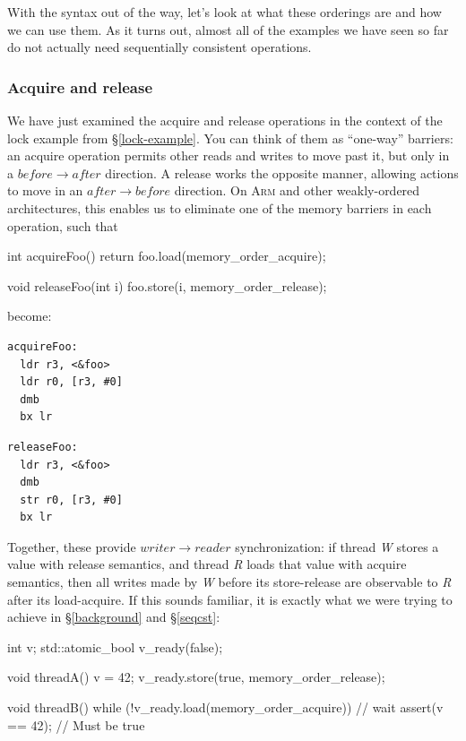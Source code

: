 \documentclass[fontsize=10pt, oneside]{scrartcl}
\newcommand{\secref}[1]{\hyperref[#1]{\textsc{\S}\ref*{#1}}}
\begin{document}
With the syntax out of the way,
let's look at what these orderings are and how we can use them.
As it turns out, almost all of the examples we have seen so far do not actually need sequentially consistent operations.

\subsubsection{Acquire and release}

We have just examined the acquire and release operations in the context of the lock example from \secref{lock-example}.
You can think of them as ``one-way'' barriers: an acquire operation permits other reads and writes to move past it,
but only in a $before \to after$ direction.
A release works the opposite manner, allowing actions to move in an $after \to before$ direction.
On \textsc{Arm} and other weakly-ordered architectures, this enables us to eliminate one of the memory barriers in each operation,
such that

\begin{cppcode}
int acquireFoo()
{
    return foo.load(memory_order_acquire);
}

void releaseFoo(int i)
{
    foo.store(i, memory_order_release);
}
\end{cppcode}
become:
\begin{minipage}{0.45\linewidth}
\begin{lstlisting}[language={[ARM]Assembler}]
acquireFoo:
  ldr r3, <&foo>
  ldr r0, [r3, #0]
  dmb
  bx lr
\end{lstlisting}
\end{minipage}
\begin{minipage}{0.45\linewidth}
\begin{lstlisting}[language={[ARM]Assembler}]
releaseFoo:
  ldr r3, <&foo>
  dmb
  str r0, [r3, #0]
  bx lr
\end{lstlisting}
\end{minipage}

Together, these provide $writer \to reader$ synchronization:
if thread \textit{W} stores a value with release semantics,
and thread \textit{R} loads that value with acquire semantics,
then all writes made by \textit{W} before its store-release are observable to \textit{R} after its load-acquire.
If this sounds familiar, it is exactly what we were trying to achieve in
\secref{background} and \secref{seqcst}:
\begin{cppcode}
int v;
std::atomic_bool v_ready(false);

void threadA()
{
    v = 42;
    v_ready.store(true, memory_order_release);
}

void threadB()
{
    while (!v_ready.load(memory_order_acquire)) {
        // wait
    }
    assert(v == 42); // Must be true
}
\end{cppcode}
\end{document}

